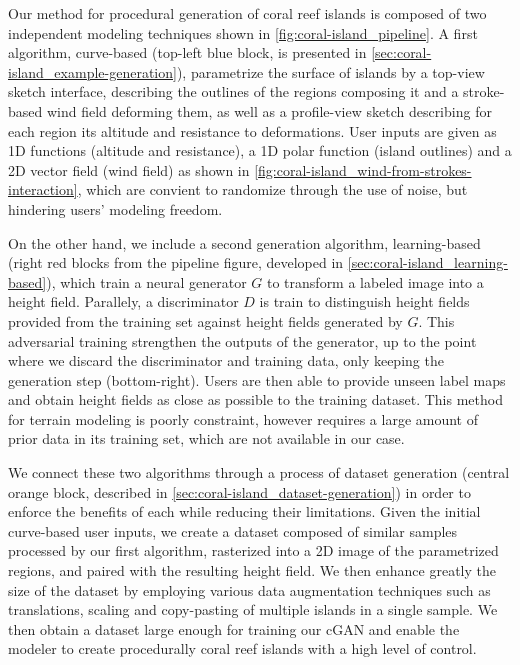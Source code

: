 Our method for procedural generation of coral reef islands is composed of two independent modeling techniques shown in \cref{fig:coral-island_pipeline}. A first algorithm, curve-based (top-left blue block, is presented in \cref{sec:coral-island_example-generation}), parametrize the surface of islands by a top-view sketch interface, describing the outlines of the regions composing it and a stroke-based wind field deforming them, as well as a profile-view sketch describing for each region its altitude and resistance to deformations. User inputs are given as 1D functions (altitude and resistance), a 1D polar function (island outlines) and a 2D vector field (wind field) as shown in \cref{fig:coral-island_wind-from-strokes-interaction}, which are convient to randomize through the use of noise, but hindering users' modeling freedom.

On the other hand, we include a second generation algorithm, learning-based (right red blocks from the pipeline figure, developed in \cref{sec:coral-island_learning-based}), which train a neural generator $G$ to transform a labeled image into a height field. Parallely, a discriminator $D$ is train to distinguish height fields provided from the training set against height fields generated by $G$. This adversarial training strengthen the outputs of the generator, up to the point where we discard the discriminator and training data, only keeping the generation step (bottom-right). Users are then able to provide unseen label maps and obtain height fields as close as possible to the training dataset. This method for terrain modeling is poorly constraint, however requires a large amount of prior data in its training set, which are not available in our case.

We connect these two algorithms through a process of dataset generation (central orange block, described in \cref{sec:coral-island_dataset-generation}) in order to enforce the benefits of each while reducing their limitations. Given the initial curve-based user inputs, we create a dataset composed of similar samples processed by our first algorithm, rasterized into a 2D image of the parametrized regions, and paired with the resulting height field. We then enhance greatly the size of the dataset by employing various data augmentation techniques such as translations, scaling and copy-pasting of multiple islands in a single sample. We then obtain a dataset large enough for training our cGAN and enable the modeler to create procedurally coral reef islands with a high level of control.


